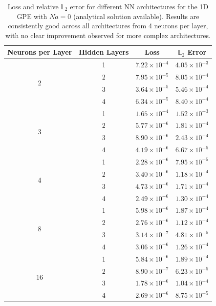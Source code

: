 \documentclass[a4paper, titlepage]{article}
\begin{document}
\begin{table}[htbp]
    \centering
    \begin{tabular}{cccc}
        \toprule
        \textbf{Neurons per Layer} & \textbf{Hidden Layers} & \textbf{Loss}
        & \textbf{$\mathbb{L}_2$ Error} \\
        \midrule
        \multirow{4}{*}{2} 
        & 1 & $7.22 \times 10^{-4}$ & $4.05 \times 10^{-3}$ \\
        & 2 & $7.95 \times 10^{-5}$ & $8.05 \times 10^{-4}$ \\
        & 3 & $3.64 \times 10^{-5}$ & $5.46 \times 10^{-4}$ \\
        & 4 & $6.34 \times 10^{-5}$ & $8.40 \times 10^{-4}$ \\
        \midrule
        \multirow{4}{*}{3} 
        & 1 & $1.65 \times 10^{-4}$ & $1.52 \times 10^{-3}$ \\
        & 2 & $5.77 \times 10^{-6}$ & $1.81 \times 10^{-4}$ \\
        & 3 & $8.90 \times 10^{-6}$ & $2.43 \times 10^{-4}$ \\
        & 4 & $4.19 \times 10^{-6}$ & $6.67 \times 10^{-5}$ \\
        \midrule
        \multirow{4}{*}{4} 
        & 1 & $2.28 \times 10^{-6}$ & $7.95 \times 10^{-5}$ \\
        & 2 & $3.40 \times 10^{-6}$ & $1.18 \times 10^{-4}$ \\
        & 3 & $4.73 \times 10^{-6}$ & $1.71 \times 10^{-4}$ \\
        & 4 & $2.49 \times 10^{-6}$ & $1.30 \times 10^{-4}$ \\
        \midrule
        \multirow{4}{*}{8} 
        & 1 & $5.98 \times 10^{-6}$ & $1.87 \times 10^{-4}$ \\
        & 2 & $2.76 \times 10^{-6}$ & $1.12 \times 10^{-4}$ \\
        & 3 & $3.14 \times 10^{-7}$ & $4.81 \times 10^{-5}$ \\
        & 4 & $3.06 \times 10^{-6}$ & $1.26 \times 10^{-4}$ \\
        \midrule
        \multirow{4}{*}{16} 
        & 1 & $5.84 \times 10^{-6}$ & $1.89 \times 10^{-4}$ \\
        & 2 & $8.90 \times 10^{-7}$ & $6.23 \times 10^{-5}$ \\
        & 3 & $1.78 \times 10^{-6}$ & $1.04 \times 10^{-4}$ \\
        & 4 & $2.69 \times 10^{-6}$ & $8.75 \times 10^{-5}$ \\
        \bottomrule
    \end{tabular}
    \caption{Loss and relative $\mathbb{L}_2$ error for different NN
    architectures for the 1D GPE with $Na = 0$ (analytical solution available).
    Results are consistently good across all architectures from 4 neurons per
    layer, with no clear improvement observed for more complex architectures.}
    \label{tab:1d_gpe}
\end{table}
\end{document}

